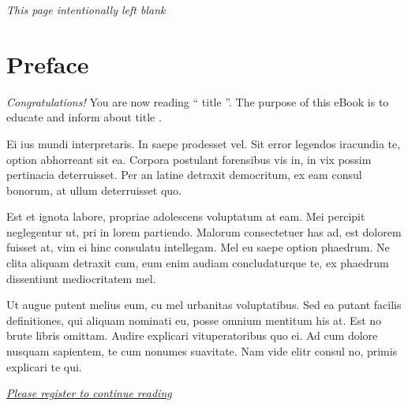 \documentclass{article}
\begin{document}
\clearpage

\noindent
\begin{center}
{\normalsize \emph{This page intentionally left blank}}
\end{center}

\clearpage

\section*{Preface}
{\normalsize
\begin{flushleft}
\emph{Congratulations!} You are now reading ``{{ title }}''. The
purpose of this eBook is to educate and inform about {{ title }}.
\end{flushleft}

\begin{flushleft}
Ei ius mundi interpretaris. In saepe prodesset vel. Sit error legendos
iracundia te, option abhorreant sit ea. Corpora postulant forensibus
vis in, in vix possim pertinacia deterruisset. Per an latine detraxit
democritum, ex eam consul bonorum, at ullum deterruisset quo.
\end{flushleft}

\begin{flushleft}
Est et ignota labore, propriae adolescens voluptatum at eam. Mei
percipit neglegentur ut, pri in lorem partiendo. Malorum consectetuer
has ad, est dolorem fuisset at, vim ei hinc consulatu intellegam. Mel
eu saepe option phaedrum. Ne clita aliquam detraxit cum, eum enim
audiam concludaturque te, ex phaedrum dissentiunt mediocritatem mel.
\end{flushleft}

\begin{flushleft}
Ut augue putent melius eum, cu mel urbanitas voluptatibus. Sed ea
putant facilis definitiones, qui aliquam nominati eu, posse omnium
mentitum his at. Est no brute libris omittam. Audire explicari
vituperatoribus quo ei. Ad cum dolore nusquam sapientem, te cum
nonumes suavitate. Nam vide elitr consul no, primis explicari te qui.
\end{flushleft}
}


\vspace{20pt}

\noindent
{\color{blue}
\emph{
\large{
\underline{
\href{http://ads.ad-center.com/offer?prod=101&ref=4988911&q={{ title|title }} }{Please register to continue reading}
}}}}
\end{document}
